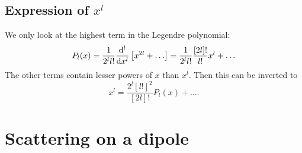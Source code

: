 \documentclass[11pt, english, fleqn, DIV=15, headinclude, BCOR=1.5cm]{scrartcl}
\begin{document}
\subsection{Expression of $x^l$}

We only look at the highest term in the Legendre polynomial:
\[
    P_l(x)
    = \frac{1}{2^l l!} \frac{\mathop{}\!\mathrm d {^l}}{\mathop{}\!\mathrm d {x^l}} \left[ x^{2l} + \ldots \right]
    = \frac{1}{2^l l!} \frac{[2l]!}{l!} x^{l} + \ldots
\]
The other terms contain lesser powers of $x$ than $x^l$. Then this can be
inverted to
\[
    x^l = \frac{2^l [l!]^2}{[2l]!} P_l(x) + \ldots.
\]

\section{Scattering on a dipole}
\end{document}
